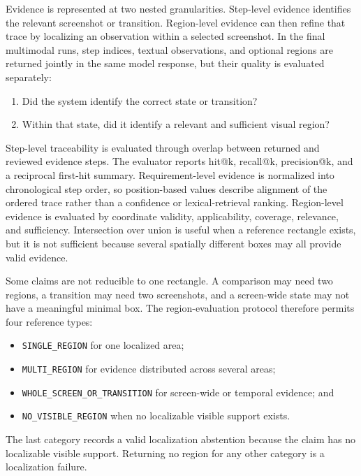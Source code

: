 Evidence is represented at two nested granularities. Step-level evidence
identifies the relevant screenshot or transition. Region-level evidence can
then refine that trace by localizing an observation within a selected
screenshot. In the final multimodal runs, step indices, textual observations,
and optional regions are returned jointly in the same model response, but their
quality is evaluated separately:

\begin{enumerate}
\def\labelenumi{\arabic{enumi}.}
\tightlist
\item
  Did the system identify the correct state or transition?
\item
  Within that state, did it identify a relevant and sufficient visual region?
\end{enumerate}

Step-level traceability is evaluated through overlap between returned and
reviewed evidence steps. The evaluator reports hit@k, recall@k, precision@k,
and a reciprocal first-hit summary. Requirement-level evidence is normalized
into chronological step order, so position-based values describe alignment of
the ordered trace rather than a confidence or lexical-retrieval ranking.
Region-level evidence is evaluated by coordinate validity, applicability,
coverage, relevance, and sufficiency.
Intersection over union is useful when a reference rectangle exists, but it is
not sufficient because several spatially different boxes may all provide valid
evidence.

Some claims are not reducible to one rectangle. A comparison may need two
regions, a transition may need two screenshots, and a screen-wide state may not
have a meaningful minimal box. The region-evaluation protocol therefore permits
four reference types:

\begin{itemize}
\tightlist
\item
  \texttt{SINGLE\_REGION} for one localized area;
\item
  \texttt{MULTI\_REGION} for evidence distributed across several areas;
\item
  \texttt{WHOLE\_\allowbreak SCREEN\_\allowbreak OR\_\allowbreak TRANSITION} for screen-wide or temporal evidence; and
\item
  \texttt{NO\_\allowbreak VISIBLE\_\allowbreak REGION} when no localizable visible support exists.
\end{itemize}

The last category records a valid localization abstention because the claim has
no localizable visible support. Returning no region for any other category is a
localization failure.

